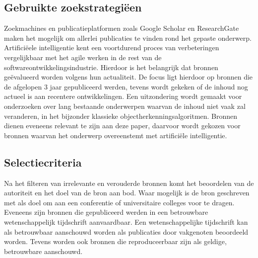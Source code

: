 \subsection{Gebruikte zoekstrategiëen}
\label{subsec:zoekstrategieen}
Zoekmachines en publicatieplatformen zoals Google Scholar en ResearchGate maken het mogelijk om allerlei publicaties te vinden rond het gepaste onderwerp.
Artifici\"eele intelligentie kent een voortdurend proces van verbeteringen vergelijkbaar met het agile werken in de rest van de softwareontwikkelingsindustrie.
Hierdoor is het belangrijk dat bronnen ge\"evalueerd worden volgens hun actualiteit.
De focus ligt hierdoor op bronnen die de afgelopen 3 jaar gepubliceerd werden, tevens wordt gekeken of de inhoud nog actueel is aan recentere ontwikkelingen.
Een uitzondering wordt gemaakt voor onderzoeken over lang bestaande onderwerpen waarvan de inhoud niet vaak zal veranderen, in het bijzonder klassieke objectherkenningsalgoritmen.
Bronnen dienen eveneens relevant te zijn aan deze paper, daarvoor wordt gekozen voor bronnen waarvan het onderwerp overeenstemt met artifici\"ele intelligentie.

\subsection{Selectiecriteria}
\label{subsec:selectiecriteria}
Na het filteren van irrelevante en verouderde bronnen komt het beoordelen van de autoriteit en het doel van de bron aan bod.
Waar mogelijk is de bron geschreven met als doel om aan een conferentie of universitaire colleges voor te dragen.
Eveneens zijn bronnen die gepubliceerd werden in een betrouwbare wetenschappelijk tijdschrift aanvaardbaar.
Een wetenschappelijke tijdschrift kan als betrouwbaar aanschouwd worden als publicaties door vakgenoten beoordeeld worden.
Tevens worden ook bronnen die reproduceerbaar zijn als geldige, betrouwbare aanschouwd.

